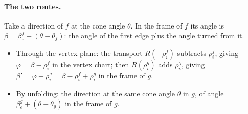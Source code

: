 \paragraph{The two routes.} Take a direction of $f$ at the cone angle $\theta$. In the frame of $f$ its angle is $\beta = \beta_e^f + (\theta - \theta_f)$: the angle of the first edge plus the angle turned from it.
\begin{itemize}
\item Through the vertex plane: the transport $R(-\rho_i^f)$ subtracts $\rho_i^f$, giving $\varphi = \beta - \rho_i^f$ in the vertex chart; then $R(\rho_i^g)$ adds $\rho_i^g$, giving $\beta' = \varphi + \rho_i^g = \beta - \rho_i^f + \rho_i^g$ in the frame of $g$.
\item By unfolding: the direction at the same cone angle $\theta$ in $g$, of angle $\beta_e^g + (\theta - \theta_g)$ in the frame of $g$.
\end{itemize}

